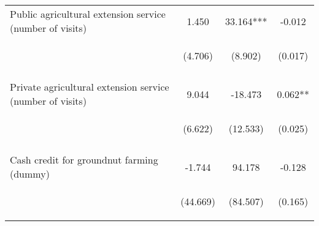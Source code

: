 \begin{center}
\begin{tabular}{lccc}
Public agricultural extension service (number of visits) & 1.450 & 33.164*** & -0.012 \\
 & \begin{footnotesize}(4.706)\end{footnotesize} & \begin{footnotesize}(8.902)\end{footnotesize} & \begin{footnotesize}(0.017)\end{footnotesize} \\
\vspace{4pt} & \begin{footnotesize}[0.758]\end{footnotesize} & \begin{footnotesize}[0.000]\end{footnotesize} & \begin{footnotesize}[0.484]\end{footnotesize} \\
Private agricultural extension service (number of visits) & 9.044 & -18.473 & 0.062** \\
 & \begin{footnotesize}(6.622)\end{footnotesize} & \begin{footnotesize}(12.533)\end{footnotesize} & \begin{footnotesize}(0.025)\end{footnotesize} \\
\vspace{4pt} & \begin{footnotesize}[0.172]\end{footnotesize} & \begin{footnotesize}[0.141]\end{footnotesize} & \begin{footnotesize}[0.012]\end{footnotesize} \\
Cash credit for groundnut farming (dummy) & -1.744 & 94.178 & -0.128 \\
 & \begin{footnotesize}(44.669)\end{footnotesize} & \begin{footnotesize}(84.507)\end{footnotesize} & \begin{footnotesize}(0.165)\end{footnotesize} \\

\end{tabular}
\end{center}
